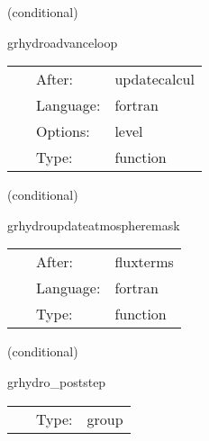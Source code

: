 \vspace{5mm}

   (conditional) 

\hspace{5mm} grhydroadvanceloop 

\hspace{5mm}{\it decrement the flux\_direction variable } 


\hspace{5mm}

 \begin{tabular*}{160mm}{cll} 
~ & After:  & updatecalcul \\ 
~ & Language:  & fortran \\ 
~ & Options:  & level \\ 
~ & Type:  & function \\ 
\end{tabular*} 


\vspace{5mm}

   (conditional) 

\hspace{5mm} grhydroupdateatmospheremask 

\hspace{5mm}{\it alter the update terms if inside the atmosphere region } 


\hspace{5mm}

 \begin{tabular*}{160mm}{cll} 
~ & After:  & fluxterms \\ 
~ & Language:  & fortran \\ 
~ & Type:  & function \\ 
\end{tabular*} 


\vspace{5mm}

   (conditional) 

\hspace{5mm} grhydro\_poststep 

\hspace{5mm}{\it post step tasks for grhydro } 


\hspace{5mm}

 \begin{tabular*}{160mm}{cll} 
~ & Type:  & group \\ 
\end{tabular*} 


